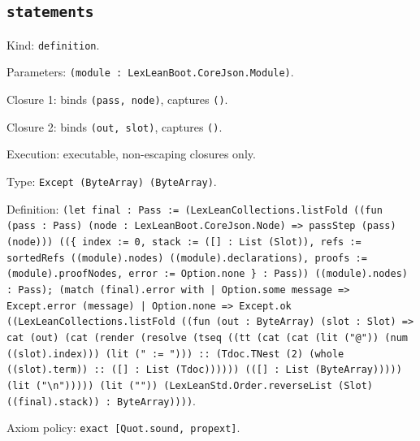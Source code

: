 \documentclass[11pt]{article}
\begin{document}
\subsection*{\texttt{statements}}
\noindent Kind: \texttt{definition}.\par
\noindent Parameters: \texttt{(module : LexLeanBoot.CoreJson.Module)}.\par
\noindent Closure 1: binds \texttt{(pass, node)}, captures \texttt{()}.\par
\noindent Closure 2: binds \texttt{(out, slot)}, captures \texttt{()}.\par
\noindent Execution: executable, non-escaping closures only.\par
\noindent Type: \texttt{Except (ByteArray) (ByteArray)}.\par
\noindent Definition: \texttt{(let final : Pass := (LexLeanCollections.listFold ((fun (pass : Pass) (node : LexLeanBoot.CoreJson.Node) => passStep (pass) (node))) ((\{ index := 0, stack := ([] : List (Slot)), refs := sortedRefs ((module).nodes) ((module).declarations), proofs := (module).proofNodes, error := Option.none \} : Pass)) ((module).nodes) : Pass); (match (final).error with | Option.some message => Except.error (message) | Option.none => Except.ok ((LexLeanCollections.listFold ((fun (out : ByteArray) (slot : Slot) => cat (out) (cat (render (resolve (tseq ((tt (cat (cat (lit ("@")) (num ((slot).index))) (lit (" := "))) :: (Tdoc.TNest (2) (whole ((slot).term)) :: ([] : List (Tdoc)))))) (([] : List (ByteArray))))) (lit ("\textbackslash{}n"))))) (lit ("")) (LexLeanStd.Order.reverseList (Slot) ((final).stack)) : ByteArray))))}.\par
\noindent Axiom policy: \texttt{exact [Quot.sound, propext]}.\par
\end{document}

